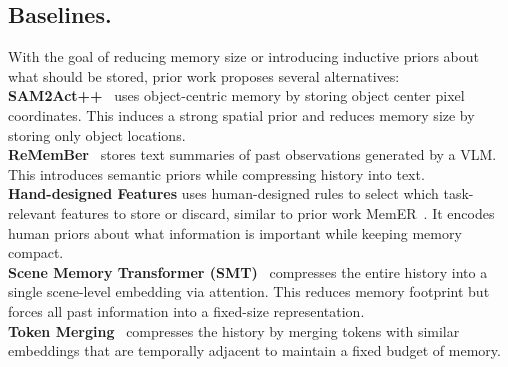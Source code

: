 \subsection{Baselines.}
With the goal of reducing memory size or introducing inductive priors about what should be stored, prior work proposes several alternatives:
\vspace{0.5em}
\\
\textbf{SAM2Act++}~\cite{sam2act} uses object-centric memory by storing object center pixel coordinates.
This induces a strong spatial prior and reduces memory size by storing only object locations.
\\
\textbf{ReMemBer}~\cite{anwar2025remembr} stores text summaries of past observations generated by a VLM.
This introduces semantic priors while compressing history into text.
\\
\textbf{Hand-designed Features} uses human-designed rules to select which task-relevant features to store or discard, similar to prior work MemER~\cite{memer}.
It encodes human priors about what information is important while keeping memory compact.
\\
\textbf{Scene Memory Transformer (SMT)}~\cite{fang2019scene} compresses the entire history into a single scene-level embedding via attention.
This reduces memory footprint but forces all past information into a fixed-size representation.
\\
\textbf{Token Merging}~\cite{memoryvla} compresses the history by merging tokens with similar embeddings that are temporally adjacent to maintain a fixed budget of memory.


